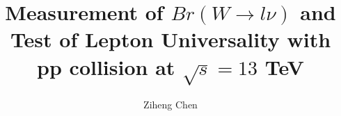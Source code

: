 \documentclass[12pt,reqno]{nuthesis}
\author{Ziheng Chen}
\title{Measurement of $Br(W\to l \nu)$ and Test of Lepton Universality with pp collision at $\sqrt{s}=13$ TeV}
\begin{document}
    
    
    


    \mainmatter  
    
    
    
    
    
    
    


    \begin{singlespace}
    
    
    \end{singlespace}
    
    
    
\end{document}
